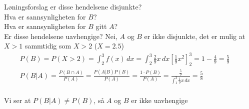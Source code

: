 \documentclass[final,hyperref={pdfpagelabels=false}]{beamer}
\newcommand{\maths}[1]{\vspace{-3mm}\begin{align*}#1\end{align*}\\\vspace{-3mm}}
\begin{document}
\begin{frame}{}
\begin{columns}[t]
\begin{column}{.33\linewidth}
\begin{block}{Løningsforslag}
{					er disse hendelsene disjunkte?\\
					Hva er sannsynligheten for $B$?\\
					Hva er sannsynligheten for $B$ gitt $A$?\\
					Er disse hendelsene uavhengige?}
				{Nei, $A$ og $B$ er ikke disjunkte, det er mulig at $X>1$ sammtidig som $X>2$ ($X=2.5$)
					\maths{P(B)=P(X>2)=\int_2^3f(x)\,dx=\int_2^3\frac{2}{9}x\,dx\left[\frac{1}{9}x^2\right]_2^3=1-\frac{4}{9}=\frac{5}{9}\\
						P(B|A)=\frac{P(B\cap A)}{P(A)}=\frac{P(A|B)P(B)}{P(A)}=\frac{1\cdot P(B)}{P(A)}=\frac{\frac{5}{9}}{\int_1^3\frac{1}{9}x\,dx}=\frac{5}{8}}
					Vi ser at $P(B|A)\neq P(B)$, så $A$ og $B$ er ikke uavhengige}
			\end{block}
		\end{column}
		\begin{column}{.66\linewidth}
		\end{column}
	\end{columns}
\end{frame}{}
\end{document}
